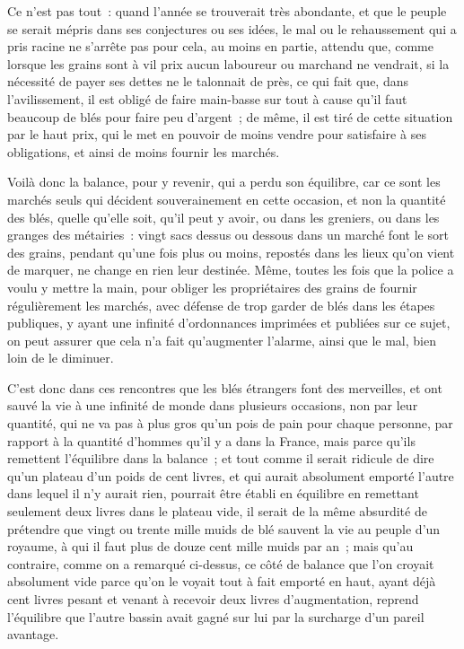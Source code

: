 \documentclass[french,twoside]{book} %
\begin{document}
Ce n’est pas tout : quand l’année se trouverait très abondante, et que le peuple se serait mépris dans ses conjectures ou ses idées, le mal ou le rehaussement qui a pris racine ne s’arrête pas pour cela, au moins en partie, attendu que, comme lorsque les grains sont à vil prix aucun laboureur ou marchand ne vendrait, si la nécessité de payer ses dettes ne le talonnait de près, ce qui fait que, dans l’avilissement, il est obligé de faire main-basse sur tout à cause qu’il faut beaucoup de blés pour faire peu d’argent ; de même, il est tiré de cette situation par le haut prix, qui le met en pouvoir de moins vendre pour satisfaire à ses obligations, et ainsi de moins fournir les marchés.\par
Voilà donc la balance, pour y revenir, qui a perdu son équilibre, car ce sont les marchés seuls qui décident souverainement en cette occasion, et non la quantité des blés, quelle qu’elle soit, qu’il peut y avoir, ou dans les greniers, ou dans les granges des métairies : vingt sacs dessus ou dessous dans un marché font le sort des grains, pendant qu’une fois plus ou moins, repostés dans les lieux qu’on vient de marquer, ne change en rien leur destinée. Même, toutes les fois que la police a voulu y mettre la main, pour obliger les propriétaires des grains de fournir régulièrement les marchés, avec défense de trop garder de blés dans les étapes publiques, y ayant une infinité d’ordonnances imprimées et publiées sur ce sujet, on peut assurer que cela n’a fait qu’augmenter l’alarme, ainsi que le mal, bien loin de le diminuer.\par
C’est donc dans ces rencontres que les blés étrangers font des merveilles, et ont sauvé la vie à une infinité de monde dans plusieurs occasions, non par leur quantité, qui ne va pas à plus gros qu’un pois de pain pour chaque personne, par rapport à la quantité d’hommes qu’il y a dans la France, mais parce qu’ils remettent l’équilibre dans la balance ; et tout comme il serait ridicule de dire qu’un plateau d’un poids de cent livres, et qui aurait absolument emporté l’autre dans lequel il n’y aurait rien, pourrait être établi en équilibre en remettant seulement deux livres dans le plateau vide, il serait de la même absurdité de prétendre que vingt ou trente mille muids de blé sauvent la vie au peuple d’un royaume, à qui il faut plus de douze cent mille muids par an ; mais qu’au contraire, comme on a remarqué ci-dessus, ce côté de balance que l’on croyait absolument vide parce qu’on le voyait tout à fait emporté en haut, ayant déjà cent livres pesant et venant à recevoir deux livres d’augmentation, reprend l’équilibre que l’autre bassin avait gagné sur lui par la surcharge d’un pareil avantage.
\end{document}
